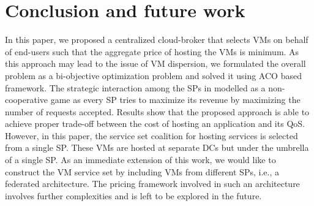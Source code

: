\documentclass[12pt,a4paper,twoside,openright]{report}
\newcommand\tab[1][0.8cm]{\hspace*{#1}}
\begin{document}
\chapter{Conclusion and future work}\label{ch:ch5}
\tab In this paper, we proposed a centralized cloud-broker that
selects VMs on behalf of end-users such that the aggregate
price of hosting the VMs is minimum. As this approach may
lead to the issue of VM dispersion, we formulated the overall
problem as a bi-objective optimization problem and solved it
using ACO based framework. The strategic interaction among
the SPs in modelled as a non-cooperative game as every SP
tries to maximize its revenue by maximizing the number of
requests accepted.
\newline
\tab Results show that the proposed approach is
able to achieve proper trade-off between the cost of hosting
an application and its QoS. However, in this paper, the service
set coalition for hosting services is selected from a single SP.
These VMs are hosted at separate DCs but under the umbrella
of a single SP. As an immediate extension of this work, we
would like to construct the VM service set by including VMs
from different SPs, i.e., a federated architecture. The pricing
framework involved in such an architecture involves further
complexities and is left to be explored in the future.
\newline
\newline
\end{document}
